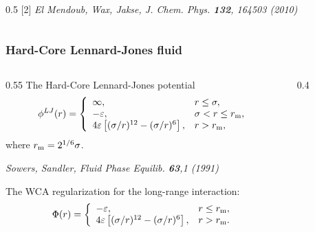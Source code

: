 \documentclass[8pt]{beamer}
\begin{document}
\begin{frame}
\begin{columns}
\begin{column}{0.5\textwidth}
				[2] \textit{El Mendoub, Wax, Jakse, J. Chem. Phys. \textbf{132}, 164503 (2010)}
			\end{column}
						
		\end{columns}
						
	\end{frame}
	
	\begin{frame}
		\frametitle{Hard-Core Lennard-Jones fluid}
		
		\begin{columns}
			\begin{column}{0.55\textwidth}
				The Hard-Core Lennard-Jones potential
				\begin{equation*}
					\phi^{LJ}(r) = \left\{
					\begin{array}{llll}
						\infty, & r\leq \sigma,
						\\
						-\varepsilon, & \sigma < r \leq r_{\rm m}, 
						\\
						4\varepsilon \left[(\sigma/r)^{12} - (\sigma/r)^6\right], & r > r_{\rm m},
					\end{array}
					\right.
				\end{equation*}
				where $r_{\rm m}=2^{1/6}\sigma$.
				
				\vspace{5mm}
				\textit{Sowers, Sandler, Fluid Phase Equilib. \textbf{63},1 (1991)}
				\hfill
				\\
				\hfill
				
				The WCA regularization for the long-range interaction:
				\begin{equation*}
					\Phi(r) = \left\{
					\begin{array}{ll}
						-\varepsilon, & r \leq r_{\rm m},
						\\
						4\varepsilon \left[(\sigma/r)^{12} - (\sigma/r)^6\right], & r > r_{\rm m}.
					\end{array}	
					\right.
				\end{equation*}
			\end{column}
			
			\begin{column}{0.4\textwidth}
				

\end{column}
\end{columns}
\end{frame}
\end{document}
